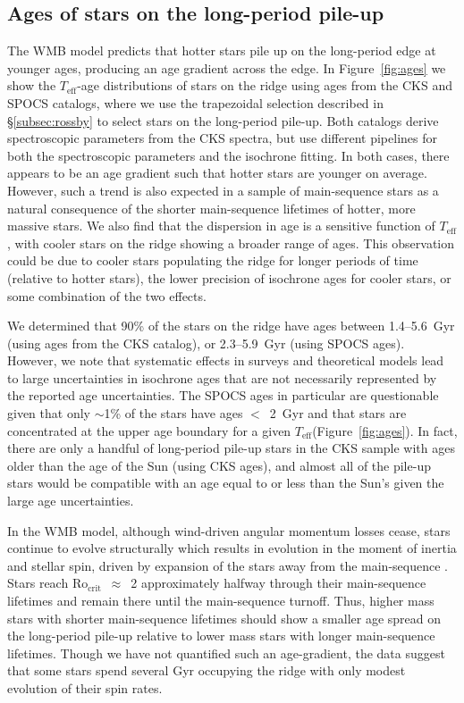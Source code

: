 \documentclass[trackchanges,twocolumn]{aastex631}
\newcommand{\rocrit}{$\mathrm{Ro_{crit}}$\xspace}
\newcommand{\teff}{\ensuremath{T_{\mathrm{eff}}}\xspace}
\begin{document}
\subsection{Ages of stars on the long-period pile-up}
\label{subsec:ages}
The WMB model predicts that hotter stars pile up on the long-period edge at younger ages, producing an age gradient across the edge. In Figure~\ref{fig:ages} we show the \teff-age distributions of stars on the ridge using ages from the CKS and SPOCS \citep{Brewer2018} catalogs, where we use the trapezoidal selection described in \S\ref{subsec:rossby} to select stars on the long-period pile-up. Both catalogs derive spectroscopic parameters from the CKS spectra, but use different pipelines for both the spectroscopic parameters and the isochrone fitting. In both cases, there appears to be an age gradient such that hotter stars are younger on average. However, such a trend is also expected in a sample of main-sequence stars as a natural consequence of the shorter main-sequence lifetimes of hotter, more massive stars. We also find that the dispersion in age is a sensitive function of \teff, with cooler stars on the ridge showing a broader range of ages. This observation could be due to cooler stars populating the ridge for longer periods of time (relative to hotter stars), the lower precision of isochrone ages for cooler stars, or some combination of the two effects.

We determined that 90\% of the stars on the ridge have ages between 1.4--5.6~Gyr (using ages from the CKS catalog), or 2.3--5.9~Gyr (using SPOCS ages). However, we note that systematic effects in surveys and theoretical models lead to large uncertainties in isochrone ages that are not necessarily represented by the reported age uncertainties. The SPOCS ages in particular are questionable given that only $\sim$1\% of the stars have ages $<$~2~Gyr and that stars are concentrated at the upper age boundary for a given \teff (Figure~\ref{fig:ages}). In fact, there are only a handful of long-period pile-up stars in the CKS sample with ages older than the age of the Sun (using CKS ages), and almost all of the pile-up stars would be compatible with an age equal to or less than the Sun's given the large age uncertainties. 

In the WMB model, although wind-driven angular momentum losses cease, stars continue to evolve structurally which results in evolution in the moment of inertia and stellar spin, driven by expansion of the stars away from the main-sequence \citep{vanSaders2019}. Stars reach \rocrit~$\approx$~2 approximately halfway through their main-sequence lifetimes and remain there until the main-sequence turnoff. Thus, higher mass stars with shorter main-sequence lifetimes should show a smaller age spread on the long-period pile-up relative to lower mass stars with longer main-sequence lifetimes. Though we have not quantified such an age-gradient, the data suggest that some stars spend several Gyr occupying the ridge with only modest evolution of their spin rates.
\end{document}
